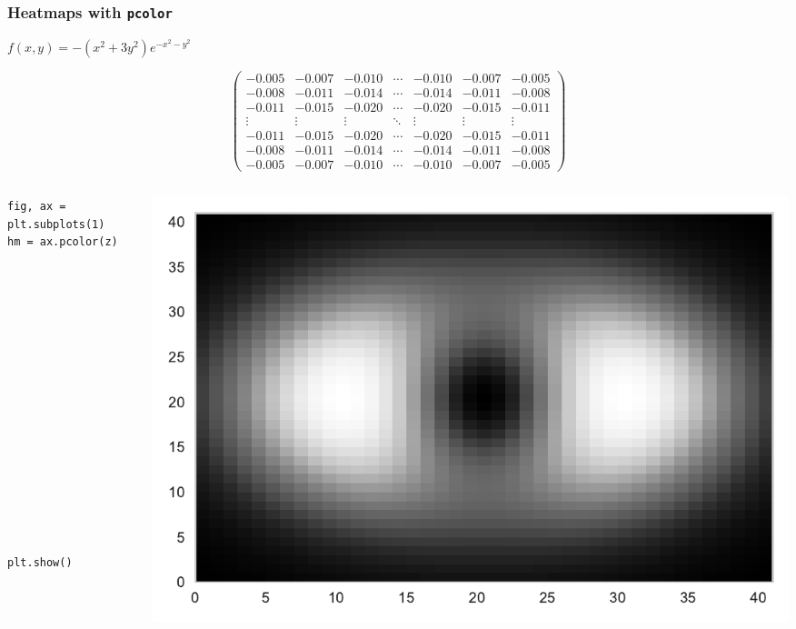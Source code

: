 \documentclass{beamer}
\begin{document}
\begin{frame}[fragile]
\frametitle{Heatmaps with \texttt{pcolor}}
\vfill
\begin{center}
$f(x, y) = -\left(x^2+3y^2\right)e^{-x^2-y^2}$
\end{center}
\vfill
\begin{equation*}
\begin{pmatrix}
-0.005 & -0.007 & -0.010 & \cdots & -0.010 & -0.007 & -0.005 \\
-0.008 & -0.011 & -0.014 & \cdots & -0.014 & -0.011 & -0.008 \\
-0.011 & -0.015 & -0.020 & \cdots & -0.020 & -0.015 & -0.011 \\
\vdots & \vdots & \vdots & \ddots & \vdots & \vdots & \vdots \\
-0.011 & -0.015 & -0.020 & \cdots & -0.020 & -0.015 & -0.011 \\
-0.008 & -0.011 & -0.014 & \cdots & -0.014 & -0.011 & -0.008 \\
-0.005 & -0.007 & -0.010 & \cdots & -0.010 & -0.007 & -0.005
\end{pmatrix}
\end{equation*}
\vfill
\end{frame}


\begin{frame}[fragile]
\tiny{
\begin{columns}
\begin{column}{0.45\textwidth}
\begin{verbatim}
fig, ax = plt.subplots(1)
hm = ax.pcolor(z)

















plt.show()
\end{verbatim}
\end{column}
\begin{column}{0.55\textwidth}
\includegraphics[width=\textwidth]{../heatmap_1.pdf}
\end{column}
\end{columns}
}
\end{frame}
\end{document}
